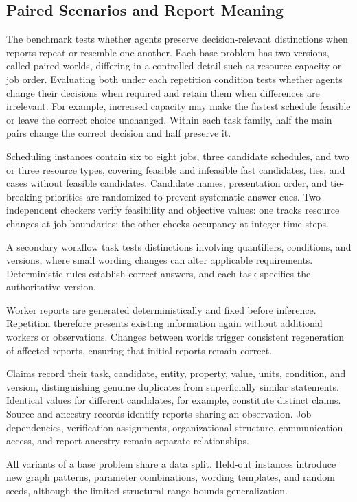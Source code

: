\documentclass{svproc}
\begin{document}
\subsection{Paired Scenarios and Report Meaning}

The benchmark tests whether agents preserve decision-relevant distinctions when reports repeat or resemble one another. Each base problem has two versions, called paired worlds, differing in a controlled detail such as resource capacity or job order. Evaluating both under each repetition condition tests whether agents change their decisions when required and retain them when differences are irrelevant. For example, increased capacity may make the fastest schedule feasible or leave the correct choice unchanged. Within each task family, half the main pairs change the correct decision and half preserve it.

Scheduling instances contain six to eight jobs, three candidate schedules, and two or three resource types, covering feasible and infeasible fast candidates, ties, and cases without feasible candidates. Candidate names, presentation order, and tie-breaking priorities are randomized to prevent systematic answer cues. Two independent checkers verify feasibility and objective values: one tracks resource changes at job boundaries; the other checks occupancy at integer time steps.

A secondary workflow task tests distinctions involving quantifiers, conditions, and versions, where small wording changes can alter applicable requirements. Deterministic rules establish correct answers, and each task specifies the authoritative version.

Worker reports are generated deterministically and fixed before inference. Repetition therefore presents existing information again without additional workers or observations. Changes between worlds trigger consistent regeneration of affected reports, ensuring that initial reports remain correct.

Claims record their task, candidate, entity, property, value, units, condition, and version, distinguishing genuine duplicates from superficially similar statements. Identical values for different candidates, for example, constitute distinct claims. Source and ancestry records identify reports sharing an observation. Job dependencies, verification assignments, organizational structure, communication access, and report ancestry remain separate relationships.

All variants of a base problem share a data split. Held-out instances introduce new graph patterns, parameter combinations, wording templates, and random seeds, although the limited structural range bounds generalization.
\end{document}
